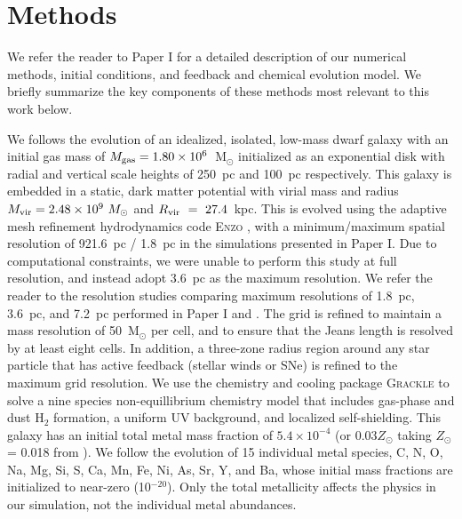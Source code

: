 \documentclass[twocolumn]{aastex62}
\begin{document}
\section{Methods} 
\label{sec:methods}
We refer the reader to Paper I for a detailed description of our numerical methods, initial conditions, and feedback and chemical evolution model. We briefly summarize the key components of these methods most relevant to this work below. 

We follows the evolution of an idealized, isolated, low-mass dwarf galaxy with an initial gas mass of $M_{\rm gas} = 1.80 \times 10^6$~M$_{\odot}$ initialized as an exponential disk with radial and vertical scale heights of 250~pc and 100~pc respectively. This galaxy is embedded in a static, \cite{Burkert1995} dark matter potential with virial mass and radius $M_{\rm vir} = 2.48\times 10^{9}~M_{\odot}$ and $R_{\rm vir}~=~27.4$~kpc. This is evolved using the adaptive mesh refinement hydrodynamics code \textsc{Enzo} \citep{Enzo2014}, with a minimum/maximum spatial resolution of 921.6~pc / 1.8~pc in the simulations presented in Paper I. Due to computational constraints, we were unable to perform this study at full resolution, and instead adopt 3.6~pc as the maximum resolution. We refer the reader to the resolution studies comparing maximum resolutions of 1.8~pc, 3.6~pc, and 7.2~pc performed in Paper I and \cite{Emerick2018b}. %
The grid is refined to maintain a mass resolution of 50~M$_{\odot}$ per cell, and to ensure that the Jeans length is resolved by at least eight cells. In addition, a three-zone radius region around any star particle that has active feedback (stellar winds or SNe) is refined to the maximum grid resolution. We use the chemistry and cooling package \textsc{Grackle} \citep{GrackleMethod} to solve a nine species non-equillibrium chemistry model that includes gas-phase and dust H$_2$ formation, a uniform UV background, and localized self-shielding. This galaxy has an initial total metal mass fraction of $5.4 \times 10^{-4}$ (or $0.03 Z_{\odot}$ taking $Z_{\odot}$ = 0.018 from \cite{Asplund2009}). We follow the evolution of 15 individual metal species, C, N, O, Na, Mg, Si, S, Ca, Mn, Fe, Ni, As, Sr, Y, and Ba, whose initial mass fractions are initialized to near-zero (10$^{-20}$). Only the total metallicity affects the physics in our simulation, not the individual metal abundances. 
\end{document}
